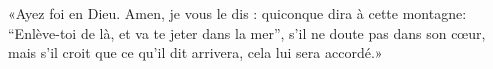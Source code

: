 \encetemps \jesusdisciples
	«Ayez foi en Dieu.
Amen, je vous le dis : quiconque dira à cette montagne:
	“Enlève-toi de là, et va te jeter dans la mer”,
	s’il ne doute pas dans son cœur, mais s’il croit que ce qu’il dit arrivera,
	cela lui sera accordé.»
